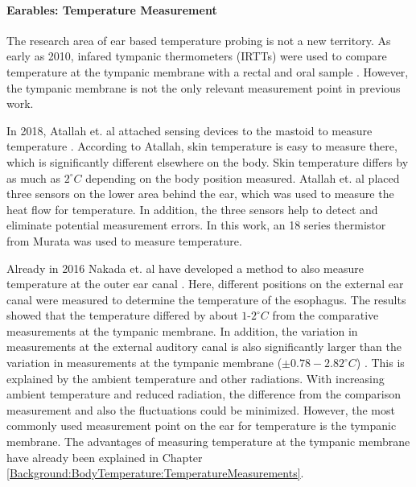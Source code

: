 \paragraph{Earables: Temperature Measurement}
The research area of ear based temperature probing is not a new territory.
As early as 2010, infared tympanic thermometers (IRTTs) were used to compare temperature at the tympanic membrane with a rectal and oral sample \cite{bagleyValidityFieldExpedient2011, basakComparisonThreeDifferent2013, bhanguDetectionManagementHypothermia2010, fogtNoninvasiveMeasuresCore2017, ComparisonTwoMethods, kallmunzerLocalHeadNeck2011, muthInfraredEarThermometry2010, moran-navarroValiditySkinOral2019, leeValidityInfraredTympanic2011, keeneAccuracyTympanicTemperature2015}.
However, the tympanic membrane is not the only relevant measurement point in previous work. 

In 2018, Atallah et. al attached sensing devices to the mastoid to measure temperature \cite{atallahErgonomicWearableCore2018}. 
According to Atallah, skin temperature is easy to measure there, which is significantly different elsewhere on the body. 
Skin temperature differs by as much as $2 ^\circ C$ depending on the body position measured.
Atallah et. al placed three sensors on the lower area behind the ear, which was used to measure the heat flow for temperature.
In addition, the three sensors help to detect and eliminate potential measurement errors.
In this work, an 18 series thermistor from Murata was used to measure temperature.

Already in 2016 Nakada et. al have developed a method to also measure temperature at the outer ear canal \cite{nakadaDevelopmentMethodEstimating2017a}.
Here, different positions on the external ear canal were measured to determine the temperature of the esophagus. 
The results showed that the temperature differed by about $1\text{-}2 ^\circ C$ from the comparative measurements at the tympanic membrane.
In addition, the variation in measurements at the external auditory canal is also significantly larger than the variation in measurements at the tympanic membrane ($\pm 0.78-2.82 ^\circ C$) \cite{nakadaDevelopmentMethodEstimating2017a}.
This is explained by the ambient temperature and other radiations.
With increasing ambient temperature and reduced radiation, the difference from the comparison measurement and also the fluctuations could be minimized.
However, the most commonly used measurement point on the ear for temperature is the tympanic membrane. 
The advantages of measuring temperature at the tympanic membrane have already been explained in Chapter \ref{Background:BodyTemperature:TemperatureMeasurements}.

